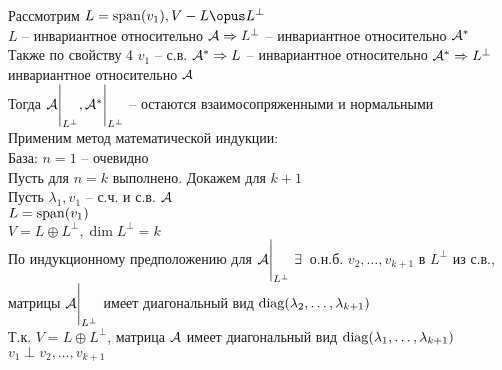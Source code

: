\documentclass[12pt]{article}
\begin{document}
    Рассмотрим $L = \span(v_1), V - L \opus L^\perp$\\
    $L$ -- инвариантное относительно $\mathcal{A} \Rightarrow L^\perp$ -- инвариантное относительно $\mathcal{A}^*$\\
    Также по свойству 4 $v_1$ -- с.в. $\mathcal{A}^* \Rightarrow L$ -- инвариантное относительно $\mathcal{A}^* \Rightarrow L^\perp$ инвариантное относительно $\mathcal{A}$\\
    Тогда $\mathcal{A} \Biggr|_{L^\perp}, \mathcal{A}^* \Biggr|_{L^\perp}$ -- остаются взаимосопряженными и нормальными\\
    Применим метод математической индукции:\\
    База: $n = 1$ -- очевидно\\
    Пусть для $n = k$ выполнено. Докажем для $k+1$\\
    Пусть $ \lambda_1, v_1$ -- с.ч. и с.в. $\mathcal{A}$\\
    $L = \operatorname{span}(v_1)$\\
    $V = L \oplus L^\perp, \dim L^\perp = k$\\
    По индукционному предположению для $\mathcal{A}\Biggr|_{L^\perp}\ \exists\,$ о.н.б. $v_2, \ldots, v_{k+1}$ в $L^\perp$ из с.в., матрицы $\mathcal{A}\Biggr|_{L^\perp}$ имеет диагональный вид $\operatorname{diag}( \lambda_2, \ldots, \lambda_{k+1})$\\
    Т.к. $V = L\oplus L^\perp$, матрица $\mathcal{A}$ имеет диагональный вид $\operatorname{diag}( \lambda_1, \ldots, \lambda_{k+1})$\\
    $v_1 \perp v_2, \ldots, v_{k+1}$
\end{document}
